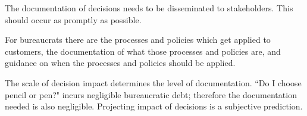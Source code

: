 The documentation of decisions needs to be disseminated to stakeholders. This should occur as promptly as possible. 


For bureaucrats there are the processes and policies which get applied to customers, the documentation of what those processes and policies are, and guidance on when the processes and policies should be applied. 

The scale of decision impact determines the level of documentation. ``Do I choose pencil or pen?" incurs negligible bureaucratic debt; therefore the documentation needed is also negligible. Projecting impact of decisions is a subjective prediction. 


